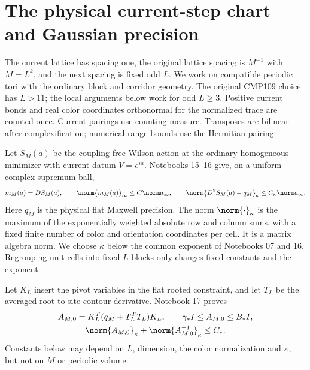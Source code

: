 \section{The physical current-step chart and Gaussian precision}
\label{pc-section}

The current lattice has spacing one, the original lattice spacing
is $M^{-1}$ with $M=L^k$, and the next spacing is fixed odd $L$.
We work on compatible periodic tori with the ordinary block and
corridor geometry. The original CMP109 choice has $L>11$; the
local arguments below work for odd $L\ge3$. Positive current bonds
and real color coordinates orthonormal for the normalized trace
are counted once. Current pairings use counting measure.
Transposes are bilinear after complexification; numerical-range
bounds use the Hermitian pairing.

Let $S_M(a)$ be the coupling-free Wilson action at the ordinary
homogeneous minimizer with current datum $V=e^{ia}$. Notebooks
15--16 give, on a uniform complex supremum ball,
\begin{equation}\label{pc-classical-input}
 m_M(a)=DS_M(a),\qquad
 \norm{m_M(a)}_\infty\le C\norm a_\infty,\qquad
 \norm{D^2S_M(a)-q_M}_\kappa\le C_\kappa\norm a_\infty.
\end{equation}
Here $q_M$ is the physical flat Maxwell precision. The norm
$\norm{\cdot}_\kappa$ is the maximum of the exponentially weighted
absolute row and column sums, with a fixed finite number of
color and orientation coordinates per cell. It is a matrix
algebra norm. We choose $\kappa$ below the common exponent of
Notebooks 07 and 16. Regrouping unit cells into fixed $L$-blocks
only changes fixed constants and the exponent.

Let $K_L$ insert the pivot variables in the flat rooted constraint,
and let $T_L$ be the averaged root-to-site contour derivative.
Notebook 17 proves
\begin{equation}\label{pc-flat-input}
 \begin{gathered}
 A_{M,0}=K_L^T(q_M+T_L^TT_L)K_L,\qquad
 \gamma_*I\le A_{M,0}\le B_*I,\\
 \norm{A_{M,0}}_\kappa+\norm{A_{M,0}^{-1}}_\kappa\le C_*.
 \end{gathered}
\end{equation}
Constants below may depend on $L$, dimension, the color
normalization and $\kappa$, but not on $M$ or periodic volume.

